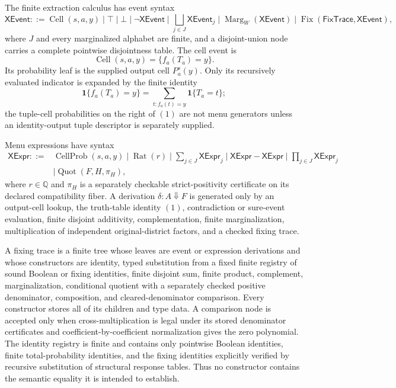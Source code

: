 The finite extraction calculus has event syntax
\[
\mathsf{XEvent}::=
\operatorname{Cell}(s,a,y)\mid\top\mid\bot\mid
\neg\mathsf{XEvent}\mid
\bigsqcup_{j\in J}\mathsf{XEvent}_j\mid
\operatorname{Marg}_{W}(\mathsf{XEvent})\mid
\operatorname{Fix}(\mathsf{FixTrace},\mathsf{XEvent}),
\]
where \(J\) and every marginalized alphabet are finite, and a disjoint-union node carries a complete pointwise disjointness table.  The cell event is
\[
\operatorname{Cell}(s,a,y)=\{f_a(T_a)=y\}.
\]
Its probability leaf is the supplied output cell \(P_a^s(y)\).  Only its recursively evaluated indicator is expanded by the finite identity
\[
\mathbf 1\{f_a(T_a)=y\}
=\sum_{t:f_a(t)=y}\mathbf 1\{T_a=t\};
\tag{1}
\]
the tuple-cell probabilities on the right of \((1)\) are not menu generators unless an identity-output tuple descriptor is separately supplied.

Menu expressions have syntax
\[
\begin{split}
\mathsf{XExpr}::={}&
\operatorname{CellProb}(s,a,y)\mid\operatorname{Rat}(r)
\mid\sum_{j\in J}\mathsf{XExpr}_j
\mid\mathsf{XExpr}-\mathsf{XExpr}
\mid\prod_{j\in J}\mathsf{XExpr}_j\\
&\mid\operatorname{Quot}(F,H,\pi_H),
\end{split}
\]
where \(r\in\mathbb Q\) and \(\pi_H\) is a separately checkable strict-positivity certificate on its declared compatibility fiber.  A derivation \(\delta:A\Downarrow F\) is generated only by an output-cell lookup, the truth-table identity \((1)\), contradiction or sure-event evaluation, finite disjoint additivity, complementation, finite marginalization, multiplication of independent original-district factors, and a checked fixing trace.

A fixing trace is a finite tree whose leaves are event or expression derivations and whose constructors are identity, typed substitution from a fixed finite registry of sound Boolean or fixing identities, finite disjoint sum, finite product, complement, marginalization, conditional quotient with a separately checked positive denominator, composition, and cleared-denominator comparison.  Every constructor stores all of its children and type data.  A comparison node is accepted only when cross-multiplication is legal under its stored denominator certificates and coefficient-by-coefficient normalization gives the zero polynomial.  The identity registry is finite and contains only pointwise Boolean identities, finite total-probability identities, and the fixing identities explicitly verified by recursive substitution of structural response tables.  Thus no constructor contains the semantic equality it is intended to establish.

